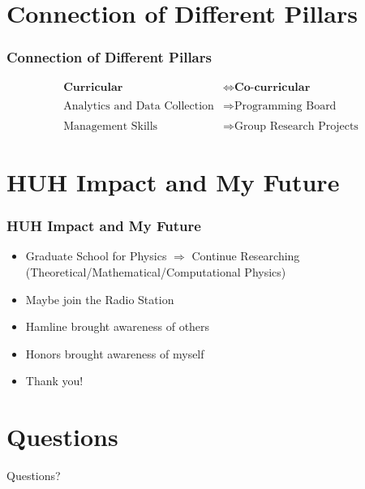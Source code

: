 \documentclass{beamer}
\begin{document}

\section{Connection of Different Pillars}

\begin{frame}
\frametitle{Connection of Different Pillars}
\begin{equation*} \begin{split} 
	\textbf{Curricular} &\iff \textbf{Co-curricular} \\
	\\
	\text{Analytics and Data Collection} &\Longrightarrow \text{Programming Board} \\
	\\
	\text{Management Skills} &\Longrightarrow \text{Group Research Projects}
\end{split} \end{equation*}
\end{frame}


\section{HUH Impact and My Future}

\begin{frame}
\frametitle{HUH Impact and My Future}
\begin{itemize}
	\item Graduate School for Physics $\Longrightarrow$ Continue Researching (Theoretical/Mathematical/Computational Physics)
	\item Maybe join the Radio Station
	\item Hamline brought awareness of others
	\item Honors brought awareness of myself
	\item Thank you!
\end{itemize}
\end{frame}


\section{Questions}

\begin{frame}
\Huge{\centerline{Questions?}}
\end{frame}

\end{document}
